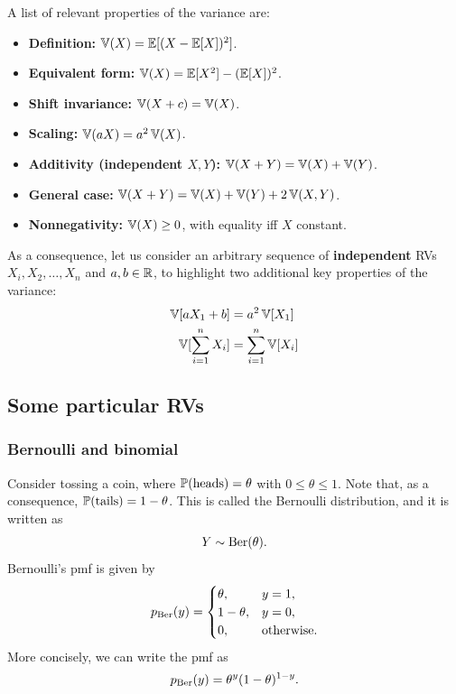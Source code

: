 A list of relevant properties of the variance are: 

\begin{itemize}
  \item \textbf{Definition:} $\operatorname{\mathbb{V}}(X) = \operatorname{\mathbb{E}}[(X - \operatorname{\mathbb{E}}[X])^2]$.
  \item \textbf{Equivalent form:} $\operatorname{\mathbb{V}}(X) = \operatorname{\mathbb{E}}[X^2] - (\operatorname{\mathbb{E}}[X])^2$.
  \item \textbf{Shift invariance:} $\operatorname{\mathbb{V}}(X + c) = \operatorname{\mathbb{V}}(X)$.
  \item \textbf{Scaling:} $\operatorname{\mathbb{V}}(aX) = a^2 \operatorname{\mathbb{V}}(X)$.
  \item \textbf{Additivity (independent $X,Y$):} $\operatorname{\mathbb{V}}(X+Y) = \operatorname{\mathbb{V}}(X) + \operatorname{\mathbb{V}}(Y)$.
  \item \textbf{General case:} $\operatorname{\mathbb{V}}(X+Y) = \operatorname{\mathbb{V}}(X) + \operatorname{\mathbb{V}}(Y) + 2\operatorname{\mathbb{V}}(X,Y)$.
  \item \textbf{Nonnegativity:} $\operatorname{\mathbb{V}}(X) \ge 0$, with equality iff $X$ constant.
\end{itemize}

As a consequence, let us consider an arbitrary sequence of \textbf{independent} RVs $X_i,X_2,\ldots, X_n$ and $a,b\in\mathbb{R}$, to highlight two additional key properties of the variance: 
\begin{align}
	\operatorname{\mathbb{V}}[aX_1 + b] &= a^2\operatorname{\mathbb{V}}[X_1]\\
	\operatorname{\mathbb{V}}[\sum_{i=1}^n X_i]	&= \sum_{i=1}^n\operatorname{\mathbb{V}}[ X_i]
\end{align}

\subsection{Some particular RVs}
\label{cap:prob_someRVs}

\subsubsection{Bernoulli and binomial}
\label{cap:prob_bernoulli}

Consider tossing a coin, where $\mathbb{P}(\text{heads})=\theta$ with $0\leq \theta \leq 1$. Note that, as a consequence, $\mathbb{P}(\text{tails})=1-\theta$. This is called the Bernoulli distribution, and it is written as 
\begin{equation}
	Y\sim\text{Ber}(\theta).
\end{equation}
Bernoulli's pmf is given by 
\[
p_{\text{Ber}}(y) =
\begin{cases}
\theta, & y = 1, \\
1 - \theta, & y = 0, \\
0, & \text{otherwise.}
\end{cases}
\]
More concisely, we can write the pmf as 
\begin{equation}
	p_{\text{Ber}}(y) = \theta^y(1-\theta)^{1-y}.
\end{equation}

